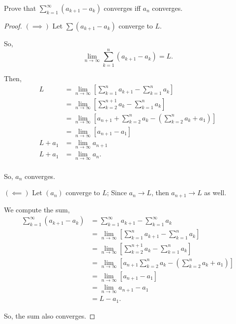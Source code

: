 \documentclass[../root file]{subfiles}
\begin{document}
Prove that $\sum_{k=1}^{\infty} (a_{k+1}-a_k)$ converges iff $a_n$ converges.



\begin{proof}
    $(\implies)$ Let $\sum (a_{k+1}-a_k)$ converge to $L$.

    So, \[\lim\limits_{n\to\infty} \sum_{k=1}^{n} (a_{k+1}-a_k) = L.\]

    Then,
    \begin{align*}
        L &= \lim\limits_{n\to\infty} \left[\sum_{k=1}^{n} a_{k+1}- \sum_{k=1}^{n} a_k\right]\\
        &= \lim\limits_{n\to\infty} \left[\sum_{k=2}^{n+1} a_{k} - \sum_{k=1}^{n} a_k\right]\\
        &= \lim\limits_{n\to\infty} \left[a_{n+1} + \sum_{k=2}^{n} a_{k} - \left(\sum_{k=2}^{n} a_k + a_1\right)\right]\\
        &= \lim\limits_{n\to\infty} [a_{n+1}-a_1]\\
        L+a_1 &= \lim\limits_{n\to\infty} a_{n+1} \\
        L+a_1 &= \lim\limits_{n\to\infty} a_n. \\
    \end{align*}

    So, $a_n$ converges.

    $(\impliedby)$ Let $(a_n)$ converge to $L$; Since $a_n\to L$, then $a_{n+1}\to L$ as well.

    We compute the sum,
    \begin{align*}
        \sum_{k=1}^{\infty}(a_{k+1}-a_k)&=\sum_{k=1}^{\infty} a_{k+1} - \sum_{k=1}^{\infty} a_k \\
        &= \lim\limits_{n\to\infty} \left[ \sum_{k=1}^{n} a_{k+1} - \sum_{k=1}^{n} a_k \right] \\
        &= \lim\limits_{n\to\infty} \left[ \sum_{k=2}^{n+1} a_k - \sum_{k=1}^{n} a_k \right] \\
        &= \lim\limits_{n\to\infty} \left[ a_{n+1} \sum_{k=2}^{n} a_k - \left(\sum_{k=2}^{n} a_k + a_1\right) \right] \\
        &= \lim\limits_{n\to\infty} [a_{n+1}-a_1] \\
        &= \lim\limits_{n\to\infty} a_{n+1} - a_1 \\
        &= L-a_1.
    \end{align*}

    So, the sum also converges.
\end{proof}
\end{document}
